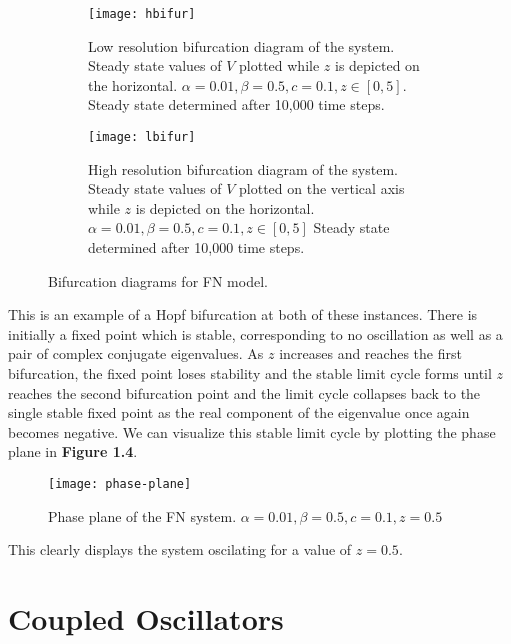 \documentclass[11pt]{report}
\begin{document}
\begin{figure}
    \centering
    \begin{subfigure}[b]{0.48\textwidth}
        \texttt{[image: hbifur]}
        \caption{Low resolution bifurcation diagram of the system. Steady state values of $V$ plotted while $z$ is depicted on the horizontal. $\alpha = 0.01, \beta = 0.5,c = 0.1,z \in [0,5]$. Steady state determined after 10,000 time steps.}
        \label{fig:lbifur}
    \end{subfigure}
    \hfill %
    \begin{subfigure}[b]{0.48\textwidth}
        \texttt{[image: lbifur]}
        \caption{High resolution bifurcation diagram of the system. Steady state values of $V$ plotted on the vertical axis while $z$ is depicted on the horizontal. $\alpha = 0.01, \beta = 0.5,c = 0.1,z \in [0,5]$ Steady state determined after 10,000 time steps.}
        \label{fig:statB}
    \end{subfigure}
    \caption{Bifurcation diagrams for FN model. }\label{fig:dispersion}
\end{figure}


This is an example of a Hopf bifurcation at both of these instances. There is initially a fixed point which is stable, corresponding to no oscillation as well as a pair of complex conjugate eigenvalues. As $z$ increases and reaches the first bifurcation, the fixed point loses stability and the stable limit cycle forms until $z$ reaches the second bifurcation point and the limit cycle collapses back to the single stable fixed point as the real component of the eigenvalue once again becomes negative. We can visualize this stable limit cycle by plotting the phase plane in \textbf{Figure 1.4}.

\begin{figure}[!ht]
  \caption{Phase plane of the FN system. $\alpha = 0.01, \beta = 0.5,c = 0.1, z = 0.5$ }
  \centering
    \texttt{[image: phase-plane]}
\end{figure}

This clearly displays the system oscilating for a value of $z=0.5$.

\section{Coupled Oscillators} %
\label{sub:coupled_oscillators}
\end{document}

